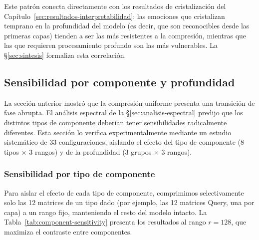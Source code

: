 Este patrón conecta directamente con los resultados de cristalización del
Capítulo~\ref{sec:resultados-interpretabilidad}: las emociones que cristalizan temprano en
la profundidad del modelo (es decir, que son reconocibles desde las primeras capas) tienden
a ser las más resistentes a la compresión, mientras que las que requieren procesamiento
profundo son las más vulnerables. La \S\ref{sec:sintesis} formaliza esta correlación.



\subsection{Sensibilidad por componente y profundidad}
\label{sec:sensibilidad-componente}

La sección anterior mostró que la compresión uniforme presenta una transición de fase
abrupta. El análisis espectral de la \S\ref{sec:analisis-espectral} predijo que los
distintos tipos de componente deberían tener sensibilidades radicalmente diferentes.
Esta sección lo verifica experimentalmente mediante un estudio sistemático de 33
configuraciones, aislando el efecto del tipo de componente (8 tipos $\times$ 3 rangos)
y de la profundidad (3 grupos $\times$ 3 rangos).

\subsubsection{Sensibilidad por tipo de componente}

Para aislar el efecto de cada tipo de componente, comprimimos selectivamente solo las 12
matrices de un tipo dado (por ejemplo, las 12 matrices Query, una por capa) a un rango
fijo, manteniendo el resto del modelo intacto. La Tabla~\ref{tab:component-sensitivity}
presenta los resultados al rango $r=128$, que maximiza el contraste entre componentes.

